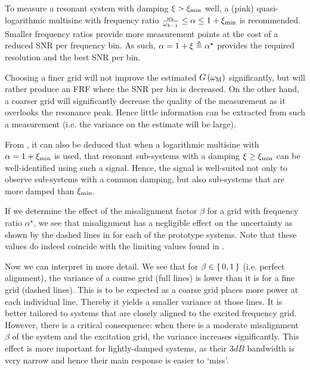    \begin{guideline}
   To measure a resonant system with damping $\damping > \damping[\min]$ well, a (pink) quasi-logarithmic multisine with frequency ratio $\frac{\omega_k}{\omega_{k-1}} \leq \alpha \leq 1 + \damping[\min]$ is recommended.
   Smaller frequency ratios provide more measurement points at the cost of a reduced \gls{SNR} per frequency bin.
   As such, $\alpha = 1 + \damping \isdef \alpha^{\star}$ provides the required resolution and the best \gls{SNR} per bin.
\end{guideline}

  Choosing a finer grid will not improve the estimated $G\left( \wM \right)$ significantly, but will rather produce an \gls{FRF} where the \gls{SNR} per bin is decreased.
  On the other hand, a coarser grid will significantly decrease the quality of the measurement as it overlooks the resonance peak.
  Hence little information can be extracted from such a measurement (i.e. the variance on the estimate will be large).

  \begin{remark}
  From , it can also be deduced that when a logarithmic multisine with $\alpha = 1 + \damping[\min]$ is used, that resonant  sub-systems with a damping $\damping[] \geq \damping[\min]$ can be well-identified using such a signal.
  Hence, the signal is well-suited not only to observe sub-systems with a common damping, but also sub-systems that are more damped than $\damping[\min]$.   
  \end{remark}

  If we determine the effect of the misalignment factor $\beta$ for a grid with frequency ratio $\alpha^{\star}$, we see that misalignment has a negligible effect on the uncertainty as shown by the dashed lines in  for each of the prototype systems.
  Note that these values do indeed coincide with the limiting values found in .
  
  Now we can interpret  in more detail.
  We see that for $\beta \in \set{0,1}$ (i.e. perfect alignment), the variance of a course grid (full lines) is lower than it is for a fine grid (dashed lines).
  This is to be expected as a coarse grid places more power at each individual line.
  Thereby it yields a smaller variance at those lines.
  It is better tailored to systems that are closely aligned to the excited frequency grid.
  However, there is a critical consequence: when there is a moderate misalignment $\beta$ of the system and the excitation grid, the variance increases significantly.
  This effect is more important for lightly-damped systems, as their $3\unit{dB}$ bandwidth is very narrow and hence their main response is easier to `miss'.

